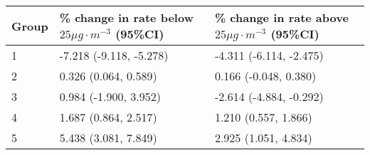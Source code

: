 \begin{tabular}{lll}
  \hline
Group & \% change in rate below $25 \mu g \cdot m^{-3}$ (95\%CI) & \% change in rate above $25 \mu g \cdot m^{-3}$ (95\%CI) \\ 
  \hline
   1 & -7.218 (-9.118, -5.278) & -4.311 (-6.114, -2.475) \\ 
     2 & 0.326 (0.064, 0.589) & 0.166 (-0.048, 0.380) \\ 
     3 & 0.984 (-1.900, 3.952) & -2.614 (-4.884, -0.292) \\ 
     4 & 1.687 (0.864, 2.517) & 1.210 (0.557, 1.866) \\ 
     5 & 5.438 (3.081, 7.849) & 2.925 (1.051, 4.834) \\ 
   \hline
\end{tabular}

